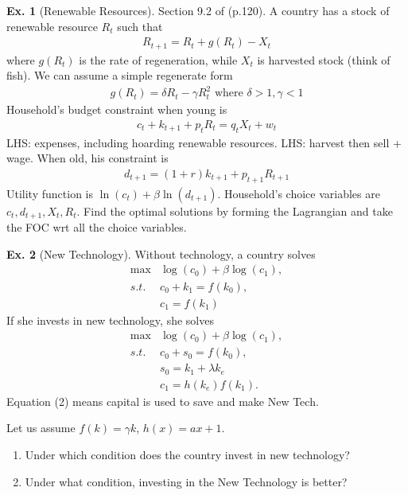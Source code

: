 \documentclass[11pt,a4paper]{book}
\theoremstyle{definition}\newtheorem{definition}{Definition}
\theoremstyle{definition}\newtheorem{fact}{Fact}
\theoremstyle{definition}\newtheorem{remark}{Remark}
\theoremstyle{definition}\newtheorem{ex}{Ex.}
\theoremstyle{definition}\newtheorem{project}{Project}
\theoremstyle{definition}\newtheorem{problem}{Problem}
\theoremstyle{definition}\newtheorem{example}{Example}
\numberwithin{theorem}{section}
\numberwithin{corollary}{chapter}
\numberwithin{assumption}{chapter}
\numberwithin{definition}{chapter}
\numberwithin{prop}{chapter}
\numberwithin{notation}{chapter}
\numberwithin{problem}{chapter}
\numberwithin{example}{chapter}
\numberwithin{fact}{chapter}
\numberwithin{ex}{chapter}
\begin{document}
	\begin{ex}[Renewable Resources] \label{ex:rr}
		Section 9.2 of \citet{farmer2010intertemporal} (p.120). A country has a stock of renewable resource $R_t$ such that
		\begin{align*}
			R_{t+1} = R_t + g(R_t) - X_t
		\end{align*}
		where $g(R_t)$ is the rate of regeneration, while $X_t$ is harvested stock (think of fish). We can assume a simple regenerate form
		\begin{align*}
			g(R_t) = \delta R_t - \gamma R_t^2 \text{ where $\delta > 1, \gamma < 1$}
		\end{align*}
		Household's budget constraint when young is
		\begin{align*}
			c_t + k_{t+1} + p_t R_t = q_t X_t + w_t
		\end{align*}
		LHS: expenses, including hoarding renewable resources. LHS: harvest then sell + wage. When old, his constraint is
		\begin{align*}
			d_{t+1} = (1+r) k_{t+1} + p_{t+1} R_{t+1}
		\end{align*}
		Utility function is $\ln(c_t) + \beta \ln(d_{t+1})$. Household's choice variables are $c_t, d_{t+1}, X_t, R_t$. Find the optimal solutions by forming the Lagrangian and take the FOC wrt all the choice variables.
	\end{ex}

		\begin{ex}[New Technology] 
		Without technology, a country solves
		\begin{align*}
			\max &\log(c_0) + \beta \log(c_1), \\
			s.t. & c_0 + k_1 = f(k_0), \\
			&c_1 = f(k_1)
		\end{align*}	
		If she invests in new technology, she solves
		\begin{align*}
			\max &\log(c_0) + \beta \log(c_1), \\
			s.t. & c_0 + s_0 = f(k_0), \\
			& s_0 = k_1 + \lambda k_e \\
			& c_1 = h(k_e) f(k_1).
		\end{align*}
		Equation (2) means capital is used to save and make New Tech.
		
		Let us assume $f(k) = \gamma k$, $h(x) = ax + 1$.
		
		\begin{enumerate}
			\item Under which condition does the country invest in new technology?
			\item Under what condition, investing in the New Technology is better?
		\end{enumerate}
	\end{ex}
	
\end{document}
